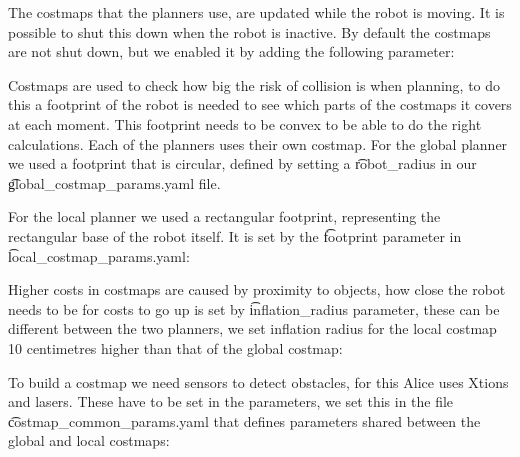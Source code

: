 The costmaps that the planners use, are updated while the robot is moving. It is possible to shut this down when the robot is inactive. By default the costmaps are not shut down, but we enabled it by adding the following parameter:



Costmaps are used to check how big the risk of collision is when planning, to do this a footprint of the robot is needed to see which parts of the costmaps it covers at each moment. This footprint needs to be convex to be able to do the right calculations. Each of the planners uses their own costmap. For the global planner we used a footprint that is circular, defined by setting a \t{robot\_radius} in our \t{global_costmap_params.yaml}  file.



For the local planner we used a rectangular footprint, representing the rectangular base of the robot itself. It is set by the \t{footprint} parameter in \t{local_costmap_params.yaml}:



Higher costs in costmaps are caused by proximity to objects, how close the robot needs to be for costs to go up is set by \t{inflation_radius} parameter, these can be different between the two planners, we set inflation radius for the local costmap 10 centimetres higher than that of the global costmap:





To build a costmap we need sensors to detect obstacles, for this Alice uses Xtions and lasers. These have to be set in the parameters, we set this in the file \t{costmap_common_params.yaml} that defines parameters shared between the global and local costmaps:

